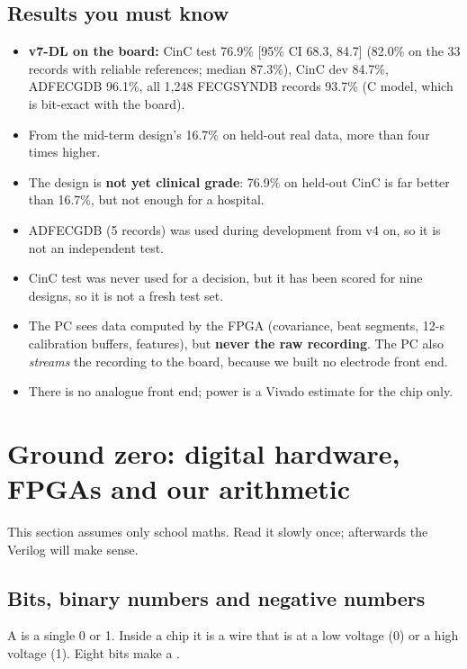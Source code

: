 \documentclass[11pt]{article}
\begin{document}
\subsection{Results you must know}
\begin{itemize}
  \item \textbf{v7-DL on the board:} CinC test 76.9\% [95\% CI 68.3, 84.7] (82.0\% on the 33 records with reliable references; median 87.3\%), CinC dev 84.7\%, ADFECGDB 96.1\%, all 1,248 FECGSYNDB records 93.7\% (C model, which is bit-exact with the board).
  \item From the mid-term design's 16.7\% on held-out real data, more than four times higher.
\end{itemize}
\begin{warn}
\begin{itemize}
  \item The design is \textbf{not yet clinical grade}: 76.9\% on held-out CinC is far better than 16.7\%, but not enough for a hospital.
  \item ADFECGDB (5 records) was used during development from v4 on, so it is not an independent test.
  \item CinC test was never used for a decision, but it has been scored for nine designs, so it is not a fresh test set.
  \item The PC sees data computed by the FPGA (covariance, beat segments, 12-s calibration buffers, features), but \textbf{never the raw recording}. The PC also \emph{streams} the recording to the board, because we built no electrode front end.
  \item There is no analogue front end; power is a Vivado estimate for the chip only.
\end{itemize}
\end{warn}

\section{Ground zero: digital hardware, FPGAs and our arithmetic}
This section assumes only school maths. Read it slowly once; afterwards the Verilog will make sense.

\subsection{Bits, binary numbers and negative numbers}
A  is a single 0 or 1. Inside a chip it is a wire that is at a low voltage (0) or a high voltage (1). Eight bits make a .
\end{document}
